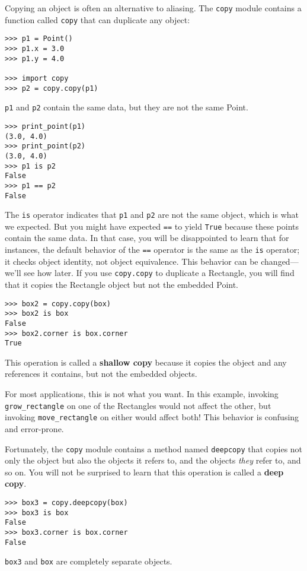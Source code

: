 \documentclass{article}
\begin{document}
Copying an object is often an alternative to aliasing. The \verb|copy|
module contains a function called \verb|copy| that can duplicate any
object:
\begin{verbatim}
>>> p1 = Point()
>>> p1.x = 3.0
>>> p1.y = 4.0

>>> import copy
>>> p2 = copy.copy(p1)
\end{verbatim}
\verb|p1| and \verb|p2| contain the same data, but they are not the same
Point.
\begin{verbatim}
>>> print_point(p1)
(3.0, 4.0)
>>> print_point(p2)
(3.0, 4.0)
>>> p1 is p2
False
>>> p1 == p2
False
\end{verbatim}
The \verb|is| operator indicates that \verb|p1| and \verb|p2| are not the
same object, which is what we expected. But you might have expected
\verb|==| to yield \verb|True| because these points contain the same data.
In that case, you will be disappointed to learn that for instances, the
default behavior of the \verb|==| operator is the same as the \verb|is|
operator; it checks object identity, not object equivalence.  This behavior
can be changed—we’ll see how later.  If you use \verb|copy.copy| to
duplicate a Rectangle, you will find that it copies the Rectangle object
but not the embedded Point.
\begin{verbatim}
>>> box2 = copy.copy(box)
>>> box2 is box
False
>>> box2.corner is box.corner
True
\end{verbatim}
This operation is called a {\bf shallow copy} because it copies the object
and any references it contains, but not the embedded objects.

For most applications, this is not what you want. In this example, invoking
\verb|grow_rectangle| on one of the Rectangles would not affect the other,
but invoking \verb|move_rectangle| on either would affect both! This
behavior is confusing and error-prone.

Fortunately, the \verb|copy| module contains a method named \verb|deepcopy| that copies
not only the object but also the objects it refers to, and the objects
\emph{they}
refer to, and so on. You will not be surprised to learn that this operation
is called a {\bf deep copy}.
\begin{verbatim}
>>> box3 = copy.deepcopy(box)
>>> box3 is box
False
>>> box3.corner is box.corner
False
\end{verbatim}
\verb|box3| and \verb|box| are completely separate objects.
\end{document}
